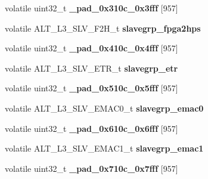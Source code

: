 \begin{DoxyCompactItemize}
\item 
\mbox{\label{structALT__L3__SLVGRP__s_a2b798f2afcfee9a2a6f2667a54a2992a}} 
volatile uint32\+\_\+t {\bfseries \+\_\+pad\+\_\+0x310c\+\_\+0x3fff} \mbox{[}957\mbox{]}
\item 
\mbox{\label{structALT__L3__SLVGRP__s_a0073a0c6f3108701a09fdfbc71bcf9fb}} 
volatile A\+L\+T\+\_\+\+L3\+\_\+\+S\+L\+V\+\_\+\+F2\+H\+\_\+t {\bfseries slavegrp\+\_\+fpga2hps}
\item 
\mbox{\label{structALT__L3__SLVGRP__s_ac0a4a37fc39d769f4a16343b04d4c559}} 
volatile uint32\+\_\+t {\bfseries \+\_\+pad\+\_\+0x410c\+\_\+0x4fff} \mbox{[}957\mbox{]}
\item 
\mbox{\label{structALT__L3__SLVGRP__s_aaf855845554be8c4b12aff4413a8e2b3}} 
volatile A\+L\+T\+\_\+\+L3\+\_\+\+S\+L\+V\+\_\+\+E\+T\+R\+\_\+t {\bfseries slavegrp\+\_\+etr}
\item 
\mbox{\label{structALT__L3__SLVGRP__s_ae3ddd6b07cdd01d783c103d7905db27f}} 
volatile uint32\+\_\+t {\bfseries \+\_\+pad\+\_\+0x510c\+\_\+0x5fff} \mbox{[}957\mbox{]}
\item 
\mbox{\label{structALT__L3__SLVGRP__s_a4b02abec863ece94044c2d93b1109049}} 
volatile A\+L\+T\+\_\+\+L3\+\_\+\+S\+L\+V\+\_\+\+E\+M\+A\+C0\+\_\+t {\bfseries slavegrp\+\_\+emac0}
\item 
\mbox{\label{structALT__L3__SLVGRP__s_af7633358d7c3b7fa959bf0e096d0da56}} 
volatile uint32\+\_\+t {\bfseries \+\_\+pad\+\_\+0x610c\+\_\+0x6fff} \mbox{[}957\mbox{]}
\item 
\mbox{\label{structALT__L3__SLVGRP__s_ae934fcb07b993cf705093c8e9a67a2f9}} 
volatile A\+L\+T\+\_\+\+L3\+\_\+\+S\+L\+V\+\_\+\+E\+M\+A\+C1\+\_\+t {\bfseries slavegrp\+\_\+emac1}
\item 
\mbox{\label{structALT__L3__SLVGRP__s_a3515c154433958ee1c1e8fc9091c0161}} 
volatile uint32\+\_\+t {\bfseries \+\_\+pad\+\_\+0x710c\+\_\+0x7fff} \mbox{[}957\mbox{]}
\item 

\end{DoxyCompactItemize}
